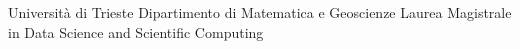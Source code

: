 \begin{titlepage}
    \begin{figure}
        \centering
        
    \end{figure}

    \begin{center}
        \LARGE{Università di Trieste}
        \vspace{5mm}
        \LARGE{Dipartimento di Matematica e Geoscienze}
        \vspace{5mm}
        \LARGE{Laurea Magistrale in Data Science and Scientific Computing}
    \end{center}
\end{titlepage}